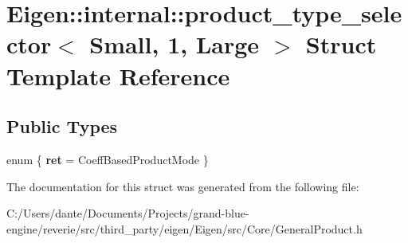 \hypertarget{struct_eigen_1_1internal_1_1product__type__selector_3_01_small_00_011_00_01_large_01_4}{}\section{Eigen\+::internal\+::product\+\_\+type\+\_\+selector$<$ Small, 1, Large $>$ Struct Template Reference}
\label{struct_eigen_1_1internal_1_1product__type__selector_3_01_small_00_011_00_01_large_01_4}
\subsection*{Public Types}
\begin{DoxyCompactItemize}
\item 
\mbox{\label{struct_eigen_1_1internal_1_1product__type__selector_3_01_small_00_011_00_01_large_01_4_a5efe3c8b6e50f28736551f61643e3d84}} 
enum \{ {\bfseries ret} = Coeff\+Based\+Product\+Mode
 \}
\end{DoxyCompactItemize}


The documentation for this struct was generated from the following file\+:\begin{DoxyCompactItemize}
\item 
C\+:/\+Users/dante/\+Documents/\+Projects/grand-\/blue-\/engine/reverie/src/third\+\_\+party/eigen/\+Eigen/src/\+Core/General\+Product.\+h\end{DoxyCompactItemize}
